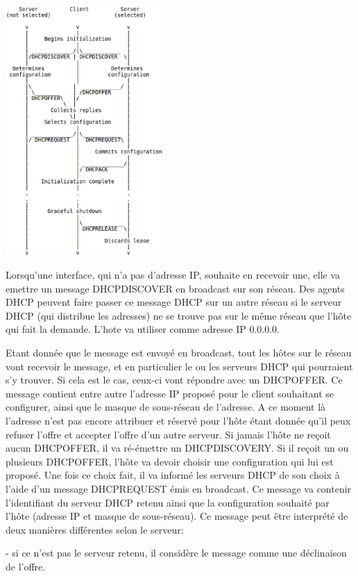 \includegraphics[width=6cm]{./pics/timeline_dhcp.eps}

Lorsqu'une interface, qui n'a pas d'adresse IP, souhaite en recevoir une, elle
va emettre un message DHCPDISCOVER en broadcast sur son réseau. Des agents DHCP
peuvent faire passer
ce message DHCP sur un autre réseau si le serveur DHCP (qui distribue les
adresses) ne se trouve pas sur le même réseau que l'hôte qui fait la demande.
L'hote va utiliser comme adresse IP 0.0.0.0.

Etant donnée que le message est envoyé en broadcast, tout les hôtes sur le
réseau vont recevoir le message, et en particulier le ou les serveurs DHCP qui
pourraient s'y trouver. Si cela est le cas, ceux-ci vont répondre avec un
DHCPOFFER. Ce message contient entre autre l'adresse IP proposé pour le client
souhaitant se configurer, ainsi que le masque de sous-réseau de l'adresse. A ce
moment là l'adresse n'est pas encore attribuer et réservé pour l'hôte étant
donnée qu'il peux refuser l'offre et accepter l'offre d'un autre serveur. Si
jamais l'hôte ne reçoit aucun DHCPOFFER, il va ré-émettre un DHCPDISCOVERY. Si
il reçoit un ou plusieurs DHCPOFFER, l'hôte va devoir choisir une configuration
qui lui est proposé. Une fois ce choix fait, il va informé les serveurs DHCP de
son choix à l'aide d'un message DHCPREQUEST émis en broadcast. Ce message va
contenir l'identifiant du serveur DHCP retenu ainsi que la configuration
souhaité par l'hôte (adresse IP et masque de sous-réseau). Ce message peut être
interprété de deux manières différentes selon le serveur:
\item- si ce n'est pas le serveur retenu, il considère le message comme une
déclinaison de l'offre.

